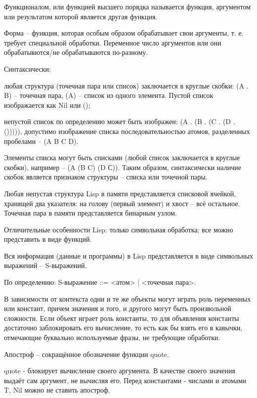 \documentclass{article}
\begin{document}

Функционалом, или функцией высшего порядка называется функция, аргументом или  результатом которой является другая функция.

Форма -- функция, которая особым образом обрабатывает свои аргументы, т. е. требует специальной обработки. Переменное число аргументов или они обрабатывются/не обрабатываются по-разному.



Синтаксически:

любая структура (точечная пара или список) заключается в круглые скобки: (A . B) – точечная пара, (A) – список из одного элемента. Пустой список изображается как Nil или ();

непустой список по определению может быть изображен: (A . (B . (C . (D . ())))),  допустимо изображение списка последовательностью атомов, разделенных пробелами – (A B C D).

Элементы списка могут быть списками (любой список заключается в круглые скобки), например – (A (B C) (D С)). Таким образом, синтаксически наличие скобок является признаком структуры – списка или точечной пары.

Любая непустая структура Lisp в памяти представляется списковой ячейкой, хранящей два указателя: на голову (первый элемент) и хвост – всё остальное. Точечная пара в памяти представляется бинарным узлом.



Отличительные особенности Lisp: только символьная обработка; все можно представить в виде функций.
	
Вся информация (данные и программы) в Lisp представляется в виде символьных выражений – S-выражений. 

По определению: S-выражение ::= <атом> | <точечная пара>.
	
В зависимости от контекста одни и те же объекты могут играть роль переменных или констант, причем значения и того, и другого могут быть произвольной сложности. Если объект играет роль константы, то для объявления константы достаточно заблокировать его вычисление, то есть как бы взять его в кавычки, отмечающие буквально используемые фразы, не требующие обработки. 

Апостроф – сокращённое обозначение функции quote.

quote - блокирует вычисление своего аргумента. В качестве своего значения выдаёт сам аргумент, не вычисляя его. Перед константами - числами и атомами T, Nil можно не ставить апостроф.
\end{document}
